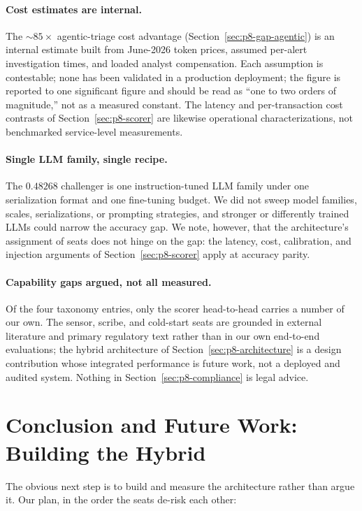 \documentclass{article}
\providecommand{\secref}[1]{Section~\ref{#1}}
\begin{document}
\paragraph{Cost estimates are internal.} The $\sim$$85\times$ agentic-triage
cost advantage (\secref{sec:p8-gap-agentic}) is an internal estimate built
from June-2026 token prices, assumed per-alert investigation times, and loaded
analyst compensation. Each assumption is contestable; none has been validated
in a production deployment; the figure is reported to one significant figure
and should be read as ``one to two orders of magnitude,'' not as a measured
constant. The latency and per-transaction cost contrasts of
\secref{sec:p8-scorer} are likewise operational characterizations, not
benchmarked service-level measurements.

\paragraph{Single LLM family, single recipe.} The $0.48268$ challenger is one
instruction-tuned LLM family under one serialization format and one
fine-tuning budget. We did not sweep model
families, scales, serializations, or prompting strategies, and stronger or
differently trained LLMs could narrow the accuracy gap. We note, however, that
the architecture's assignment of seats does not hinge on the gap: the
latency, cost, calibration, and injection arguments of \secref{sec:p8-scorer}
apply at accuracy parity.

\paragraph{Capability gaps argued, not all measured.} Of the four taxonomy
entries, only the scorer head-to-head carries a number of our own. The sensor,
scribe, and cold-start seats are grounded in external literature and primary
regulatory text rather than in our own end-to-end evaluations; the hybrid
architecture of \secref{sec:p8-architecture} is a design contribution whose
integrated performance is future work, not a deployed and audited system.
Nothing in \secref{sec:p8-compliance} is legal advice.
 \section{Conclusion and Future Work: Building the Hybrid}
\label{sec:p8-future}

The obvious next step is to build and measure the architecture rather than
argue it. Our plan, in the order the seats de-risk each other:
\end{document}
